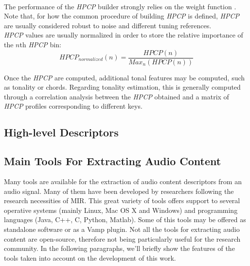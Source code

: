 \begin{itemize}
\\ The performance of the \textit{HPCP} builder strongly relies on the weight function \cite{cabral05}. Note that, for how the common procedure of building \textit{HPCP} is defined, \textit{HPCP} are usually considered robust to noise and different tuning references. \\
\textit{HPCP} values are usually normalized in order to store the relative importance of the $n$th \textit{HPCP} bin:
\begin{equation}
HPCP_{normalized}(n) = \frac{HPCP(n)}{Max_n(HPCP(n))}
\end{equation}
\end{itemize}

Once the \textit{HPCP} are computed, additional tonal features may be computed, such as tonality or chords. Regarding tonality estimation, this is generally computed through a correlation analysis between the \textit{HPCP} obtained and a matrix of \textit{HPCP} profiles corresponding to different keys. 

\subsection{High-level Descriptors}

\subsection{Main Tools For Extracting Audio Content}
Many tools are available for the extraction of audio content descriptors from an audio signal. Many of them have been developed by researchers following the research necessities of MIR. This great variety of tools offers support to several operative systems (mainly Linux, Mac OS X and Windows) and programming languages (Java, C++, C, Python, Matlab). Some of this tools may be offered as standalone software or as a Vamp plugin. Not all the tools for extracting audio content are open-source, therefore not being particularly useful for the research community. In the following paragraphs, we'll briefly show the features of the tools taken into account on the development of this work.



